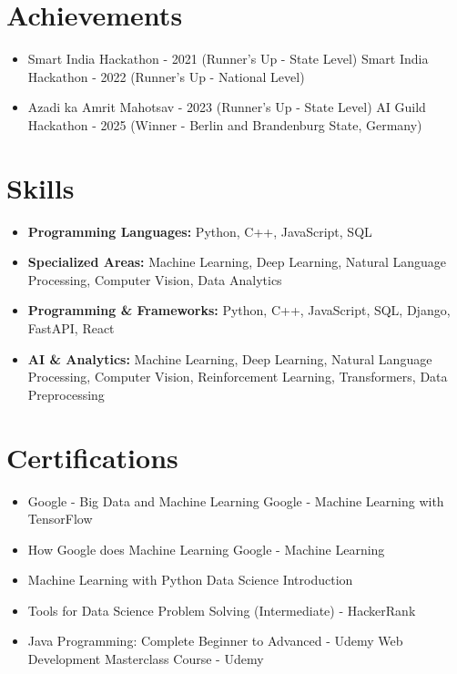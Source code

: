 \documentclass[a4paper,10pt]{article}
\begin{document}
\section*{Achievements}
\begin{itemize}
\item Smart India Hackathon - 2021 (Runner's Up - State Level) \hfill Smart India Hackathon - 2022 (Runner's Up - National Level)
\item Azadi ka Amrit Mahotsav - 2023 (Runner's Up - State Level) \hfill AI Guild Hackathon - 2025 (Winner - Berlin and Brandenburg State, Germany)
\end{itemize}

\section*{Skills}
\begin{itemize}
  \item \textbf{Programming Languages:} Python, C++, JavaScript, SQL
  \item \textbf{Specialized Areas:} Machine Learning, Deep Learning, Natural Language Processing, Computer Vision, Data Analytics
  \item \textbf{Programming \& Frameworks:} Python, C++, JavaScript, SQL, Django, FastAPI, React
  \item \textbf{AI \& Analytics:} Machine Learning, Deep Learning, Natural Language Processing, Computer Vision, Reinforcement Learning, Transformers, Data Preprocessing
\end{itemize}

\section*{Certifications}
\begin{itemize}
\item Google - Big Data and Machine Learning \hfill Google - Machine Learning with TensorFlow
\item How Google does Machine Learning \hfill Google - Machine Learning
\item Machine Learning with Python \hfill Data Science Introduction
\item Tools for Data Science \hfill Problem Solving (Intermediate) - HackerRank
\item Java Programming: Complete Beginner to Advanced - Udemy \hfill Web Development Masterclass Course - Udemy
\end{itemize}
\end{document}
